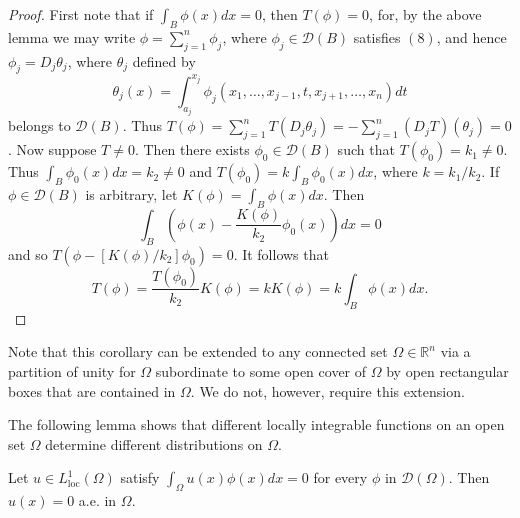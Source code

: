 \begin{proof}
  First note that if $\int_B \phi(x) d x=0$, then $T(\phi)=0$, for, by the above lemma we may write $\phi=\sum_{j=1}^n \phi_j$, where $\phi_j \in \mathscr{D}(B)$ satisfies $(8)$, and hence $\phi_j=D_j \theta_j$, where $\theta_j$ defined by
  \[
  \theta_j(x)=\int_{a_j}^{x_j} \phi_j\left(x_1, \ldots, x_{j-1}, t, x_{j+1}, \ldots, x_n\right) d t
  \]
  belongs to $\mathscr{D}(B)$. Thus $T(\phi)=\sum_{j=1}^n T\left(D_j \theta_j\right)=-\sum_{j=1}^n\left(D_j T\right)\left(\theta_j\right)=0$.
  Now suppose $T \neq 0$. Then there exists $\phi_0 \in \mathscr{D}(B)$ such that $T\left(\phi_0\right)=k_1 \neq 0$. Thus $\int_B \phi_0(x) d x=k_2 \neq 0$ and $T\left(\phi_0\right)=k \int_B \phi_0(x) d x$, where $k=k_1 / k_2$. If $\phi \in \mathscr{D}(B)$ is arbitrary, let $K(\phi)=\int_B \phi(x) d x$. Then
  \[
  \int_B\left(\phi(x)-\frac{K(\phi)}{k_2} \phi_0(x)\right) d x=0
  \]
  and so $T\left(\phi-\left[K(\phi) / k_2\right] \phi_0\right)=0$. It follows that
  \[
  T(\phi)=\frac{T\left(\phi_0\right)}{k_2} K(\phi)=k K(\phi)=k \int_B \phi(x) d x .
  \]
\end{proof}

Note that this corollary can be extended to any connected set $\Omega \in \mathbb{R}^n$ via a partition of unity for $\Omega$ subordinate to some open cover of $\Omega$ by open rectangular boxes that are contained in $\Omega$. We do not, however, require this extension.

The following lemma shows that different locally integrable functions on an open set $\Omega$ determine different distributions on $\Omega$.

\begin{lemma}
  Let $u \in L_{\mathrm{loc}}^1(\Omega)$ satisfy $\int_{\Omega} u(x) \phi(x) d x=0$ for every $\phi$ in $\mathscr{D}(\Omega)$. Then $u(x)=0$ a.e. in $\Omega$.
\end{lemma}

